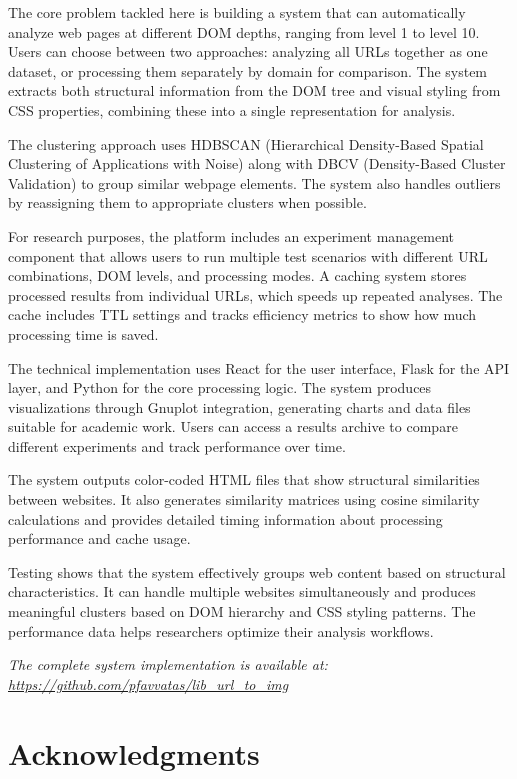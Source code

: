 \documentclass[12pt,a4paper,oneside]{book}
\begin{document}
The core problem tackled here is building a system that can automatically analyze web pages at different DOM depths, ranging from level 1 to level 10. Users can choose between two approaches: analyzing all URLs together as one dataset, or processing them separately by domain for comparison. The system extracts both structural information from the DOM tree and visual styling from CSS properties, combining these into a single representation for analysis.

The clustering approach uses HDBSCAN (Hierarchical Density-Based Spatial Clustering of Applications with Noise) along with DBCV (Density-Based Cluster Validation) to group similar webpage elements. The system also handles outliers by reassigning them to appropriate clusters when possible.

For research purposes, the platform includes an experiment management component that allows users to run multiple test scenarios with different URL combinations, DOM levels, and processing modes. A caching system stores processed results from individual URLs, which speeds up repeated analyses. The cache includes TTL settings and tracks efficiency metrics to show how much processing time is saved.

The technical implementation uses React for the user interface, Flask for the API layer, and Python for the core processing logic. The system produces visualizations through Gnuplot integration, generating charts and data files suitable for academic work. Users can access a results archive to compare different experiments and track performance over time.

The system outputs color-coded HTML files that show structural similarities between websites. It also generates similarity matrices using cosine similarity calculations and provides detailed timing information about processing performance and cache usage.

Testing shows that the system effectively groups web content based on structural characteristics. It can handle multiple websites simultaneously and produces meaningful clusters based on DOM hierarchy and CSS styling patterns. The performance data helps researchers optimize their analysis workflows.

\textit{The complete system implementation is available at: \url{https://github.com/pfavvatas/lib_url_to_img}}

\chapter*{Acknowledgments}
\end{document}
